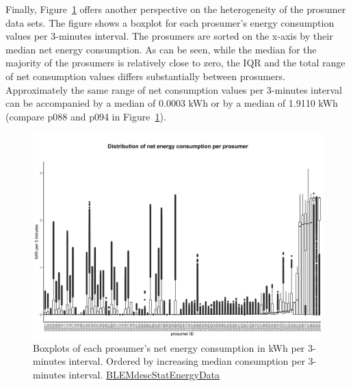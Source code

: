 Finally, Figure~\ref{Fig:pros_boxplots_consumption} offers another perspective on the heterogeneity of the prosumer data sets. The figure shows a boxplot for each prosumer's energy consumption values per 3-minutes interval. The prosumers are sorted on the x-axis by their median net energy consumption. As can be seen, while the median for the majority of the prosumers is relatively close to zero, the IQR and the total range of net consumption values differs substantially between prosumers. Approximately the same range of net consumption values per 3-minutes interval can be accompanied by a median of 0.0003 kWh or by a median of 1.9110 kWh (compare p088 and p094 in Figure~\ref{Fig:pros_boxplots_consumption}).

\begin{figure}[ht]
 \centering
\includegraphics[width=\textwidth]{thesis/graphs/prosumer_boxplots_consumption.jpg}
\caption[Boxplots of each prosumer's net energy consumption in kWh/3-minutes interval]{Boxplots of each prosumer's net energy consumption in kWh per 3-minutes interval. Ordered by increasing median consumption per 3-minutes interval. \quantnet\href{https://github.com/QuantLet/BLEM/tree/master/BLEMdescStatEnergyData}{BLEMdescStatEnergyData}}
\label{Fig:pros_boxplots_consumption}
\end{figure}

